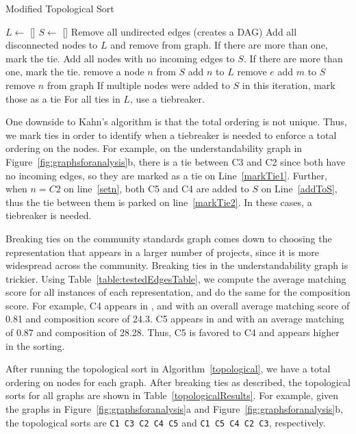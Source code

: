 \begin{algorithm}
  \caption{Modified Topological Sort}\label{topological}
  \begin{algorithmic}[1]
\State  $L \gets$ []
\State $S \gets$ []
\State Remove all undirected edges (creates a DAG)
\State Add all disconnected nodes to $L$ and remove from graph. If there are more than one, mark the tie. \label{markTie1}
\State Add all nodes with no incoming edges to $S$. If there are more than one, mark the tie. \label{addnoincomingtos}
 \label{beginwhile}
	\State remove a node $n$ from $S$ \label{setn}
	\State add $n$ to $L$  \label{addntoL}
		\State remove $e$
			\State add $m$ to $S$ \label{addToS}
		\EndIf
	\EndFor
	\State remove $n$ from graph
	\State If multiple nodes were added to $S$ in this iteration, mark those as a tie \label{markTie2}
\EndWhile
\State For all ties in $L$, use a tiebreaker.
  \end{algorithmic}
\end{algorithm}

One downside to Kahn's algorithm is that the total ordering is not unique. Thus, we mark ties in order to identify when a tiebreaker is needed to enforce a total ordering on the nodes. For example, on the understandability graph in Figure~\ref{fig:graphsforanalysis}b, there is a tie between C3 and C2 since both have no incoming edges, so they are marked as a tie on Line~\ref{markTie1}. Further, when $n=C2$ on line~\ref{setn}, both C5 and C4 are added to $S$ on Line~\ref{addToS}, thus the tie between them is parked on line~\ref{markTie2}. In these cases, a tiebreaker is needed.

Breaking ties on the community standards graph comes down to choosing the representation that appears in a larger number of projects, since it is more widespread across the community. Breaking ties in the understandability graph is trickier. Using Table~\ref{table:testedEdgesTable}, we compute the average matching score for all instances of each representation, and do the same for the composition score. For example, C4 appears in ,  and  with an overall average matching score of 0.81 and composition score of 24.3. C5 appears in  and  with an average matching of 0.87 and composition of 28.28. Thus, C5 is favored to C4 and appears higher in the sorting.

After running the topological sort in Algorithm~\ref{topological}, we have a total ordering on nodes for each graph. After breaking ties as described, the topological sorts for all graphs are shown in Table~\ref{topologicalResults}.  For example, given the graphs in Figure~\ref{fig:graphsforanalysis}a and Figure~\ref{fig:graphsforanalysis}b, the topological sorts are {\tt C1 C3 C2 C4 C5} and {\tt C1 C5 C4 C2 C3}, respectively.

